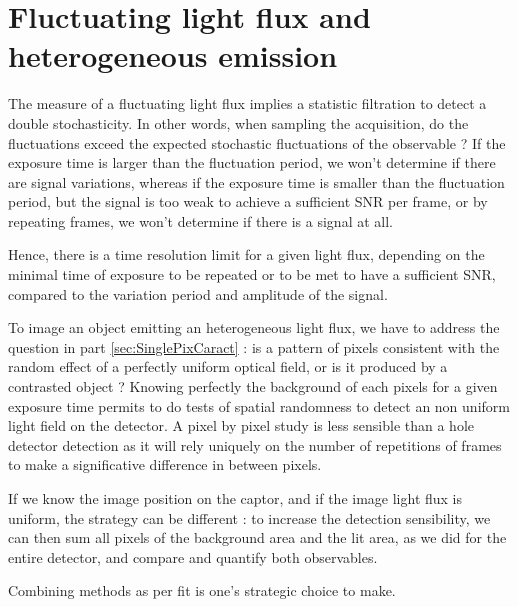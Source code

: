 
\section{Fluctuating light flux and heterogeneous emission}

The measure of a fluctuating light flux implies a statistic filtration to detect a double stochasticity.
In other words, when sampling the acquisition, do the fluctuations exceed the expected stochastic fluctuations of the observable ?
If the exposure time is larger than the fluctuation period, we won't determine if there are signal variations, whereas if the exposure time is smaller than the fluctuation period, but the signal is too weak to achieve a sufficient SNR per frame, or by repeating frames, we won't determine if there is a signal at all. \par
Hence, there is a time resolution limit for a given light flux, depending on the minimal time of exposure to be repeated or to be met to have a sufficient SNR, compared to the variation period and amplitude of the signal.\par
\medskip


To image an object emitting an heterogeneous light flux, we have to address the question in part \ref{sec:SinglePixCaract} :  is a pattern of pixels consistent with the random effect of a perfectly uniform optical field, or is it produced by a contrasted object ? Knowing perfectly the background of each pixels for a given exposure time permits to do tests of spatial randomness to detect an non uniform light field on the detector. A pixel by pixel study is less sensible than a hole detector detection as it will rely uniquely on the number of repetitions of frames to make a significative difference in between pixels. \par
If we know the image position on the captor, and if the image light flux is uniform, the strategy can be different : to increase the detection sensibility, we can then sum all pixels of the background area and the lit area, as we did for the entire detector, and compare and quantify both observables.\par
Combining methods as per fit is one's strategic choice to make.







